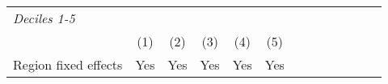 \documentclass[a4paper,12pt]{article}
\begin{document}
\date{}
\thispagestyle{empty}


\begin{table}[H]
\footnotesize
\centering

\begin{tabular}{l*{6}{cc}}
\hline
\hline
\hspace{-0.2cm}\textit{Deciles 1-5}\\
&\multicolumn{1}{c}{(1)}&\multicolumn{1}{c}{(2)}                    &\multicolumn{1}{c}{(3)}&\multicolumn{1}{c}{(4)} &\multicolumn{1}{c}{(5)} \\

Region fixed effects  &\multicolumn{1}{c}{Yes}   &\multicolumn{1}{c}{Yes}   &\multicolumn{1}{c}{Yes}   &\multicolumn{1}{c}{Yes} &\multicolumn{1}{c}{Yes}     \\
\hline
\hline
\end{tabular}
\end{table}
\end{document}
